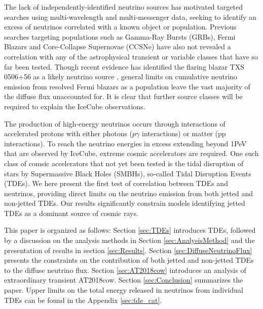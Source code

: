 \documentclass[twocolumn, tighten, linenumbers]{aastex62}
\begin{document}
The lack of independently-identified neutrino sources has motivated targeted searches using multi-wavelength and multi-messenger data, seeking to identify an excess of neutrinos correlated with a known object or population. Previous searches targeting populations such as Gamma-Ray Bursts (GRBs), Fermi Blazars and Core-Collapse Supernovae (CCSNe) have also not revealed a correlation with any of the astrophysical transient or variable classes that have so far been tested. Though recent evidence has identified the flaring blazar TXS 0506+56 as a likely neutrino source \citep{IceCube:2018cha}, general limits on cumulative neutrino emission from resolved Fermi blazars as a population leave the vast majority of the diffuse flux unaccounted for. It is clear that further source classes will be required to explain the IceCube observations.

The production of high-energy neutrinos occurs through interactions of accelerated protons with either photons ($p\gamma$ interactions) or matter (pp interactions). To reach the neutrino energies in excess extending beyond 1PeV that are observed by IceCube, extreme cosmic accelerators are required. One such class of comsic accelerators that not yet been tested is the tidal disruption of stars by Supermassive Black Holes (SMBHs), so-called Tidal Disruption Events (TDEs). We here present the first test of correlation between TDEs and neutrinos, providing direct limits on the neutrino emission from both jetted and non-jetted TDEs. Our results significantly constrain models identifying jetted TDEs as a dominant source of cosmic rays.

This paper is organized as follows: Section \ref{sec:TDEs} introduces TDEs, followed by a discussion on the analysis methods in Section \ref{sec:AnalysisMethod} and the presentation of results in section \ref{sec:Results}. Section \ref{sec:DiffuseNeutrinoFlux} presents the constraints on the contribution of both jetted and non-jetted TDEs to the diffuse neutrino flux. Section \ref{sec:AT2018cow} introduces an analysis of extraordinary transient AT2018cow. Section \ref{sec:Conclusion} summarizes the paper. Upper limits on the total energy released in neutrinos from individual TDEs can be found in the Appendix \ref{sec:tde_cat}.
\end{document}
